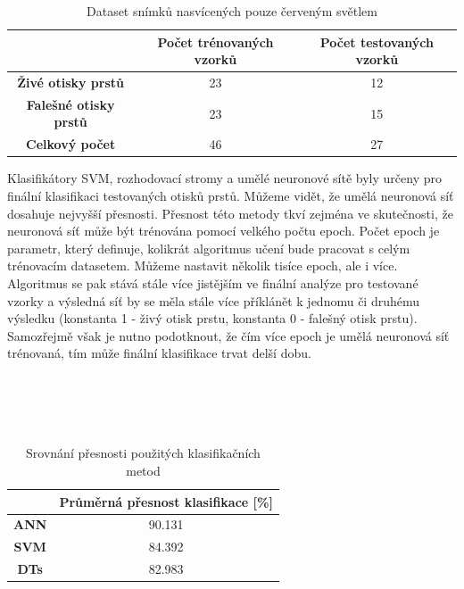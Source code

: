 \capstartfalse
\begin{table}[!htbp]
\centering
\begin{tabular}{|c|c|c|}
\hline
\textbf{}                     & \textbf{Počet trénovaných vzorků} & \textbf{Počet testovaných vzorků} \\ \hline
\textbf{Živé otisky prstů}    & 23                                & 12                                \\ \hline
\textbf{Falešné otisky prstů} & 23                                & 15                                \\ \hline
\textbf{Celkový počet}               & 46                                & 27                                \\ \hline
\end{tabular}
\caption{Dataset snímků nasvícených pouze červeným světlem}
\end{table}
\capstarttrue

Klasifikátory SVM, rozhodovací stromy a umělé neuronové sítě byly určeny pro finální klasifikaci testovaných otisků prstů. Můžeme vidět, že umělá neuronová síť dosahuje nejvyšší přesnosti. Přesnost této metody tkví zejména ve skutečnosti, že neuronová síť může být trénována pomocí velkého počtu epoch. Počet epoch je parametr, který definuje, kolikrát algoritmus učení bude pracovat s celým trénovacím datasetem. \cite{BatchEpochANN} Můžeme nastavit několik tisíce epoch, ale i více. Algoritmus se pak stává stále více jistějším ve finální analýze pro testované vzorky a výsledná síť by se měla stále více příklánět k jednomu či druhému výsledku (konstanta 1 - živý otisk prstu, konstanta 0 - falešný otisk prstu). Samozřejmě však je nutno podotknout, že čím více epoch je umělá neuronová síť trénovaná, tím může finální klasifikace trvat delší dobu. \\\\\\\\\

\capstartfalse
\begin{table}[!htbp]
\centering
\begin{tabular}{|c|c|}
\hline
                             & \textbf{Průměrná přesnost klasifikace {[}\%{]}} \\ \hline
\textbf{ANN} & 90.131                                         \\ \hline
\textbf{SVM}                 & 84.392                                         \\ \hline
\textbf{DTs}   & 82.983                                         \\ \hline
\end{tabular}
\caption{Srovnání přesnosti použitých klasifikačních metod}
\end{table}
\capstarttrue


